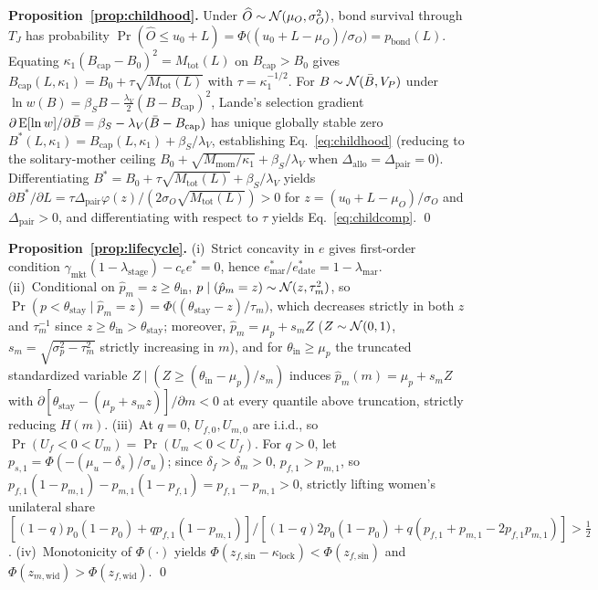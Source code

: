 \noindent\textbf{Proposition~\ref{prop:childhood}.} Under $\widehat{O}\sim\mathcal{N}(\mu_O,\sigma_O^2)$, bond survival through $T_J$ has probability $\Pr(\widehat{O}\le u_0+L)=\Phi\big((u_0+L-\mu_O)/\sigma_O\big)=p_{\mathrm{bond}}(L)$. Equating $\kappa_1(B_{\mathrm{cap}}-B_0)^2=M_{\mathrm{tot}}(L)$ on $B_{\mathrm{cap}}>B_0$ gives $B_{\mathrm{cap}}(L,\kappa_1)=B_0+\tau\sqrt{M_{\mathrm{tot}}(L)}$ with $\tau=\kappa_1^{-1/2}$. For $B\sim\mathcal{N}(\bar B,V_P)$ under $\ln w(B)=\beta_S B-\tfrac{\lambda_V}{2}(B-B_{\mathrm{cap}})^2$, Lande's selection gradient $\partial\operatorname{E}[\ln w]/\partial\bar B=\beta_S-\lambda_V(\bar B-B_{\mathrm{cap}})$ has unique globally stable zero $B^*(L,\kappa_1)=B_{\mathrm{cap}}(L,\kappa_1)+\beta_S/\lambda_V$, establishing Eq.~\eqref{eq:childhood} (reducing to the solitary-mother ceiling $B_0+\sqrt{M_{\mathrm{mom}}/\kappa_1}+\beta_S/\lambda_V$ when $\Delta_{\mathrm{allo}}=\Delta_{\mathrm{pair}}=0$). Differentiating $B^*=B_0+\tau\sqrt{M_{\mathrm{tot}}(L)}+\beta_S/\lambda_V$ yields $\partial B^*/\partial L=\tau\Delta_{\mathrm{pair}}\varphi(z)/(2\sigma_O\sqrt{M_{\mathrm{tot}}(L)})>0$ for $z=(u_0+L-\mu_O)/\sigma_O$ and $\Delta_{\mathrm{pair}}>0$, and differentiating with respect to $\tau$ yields Eq.~\eqref{eq:childcomp}. \qed

\noindent\textbf{Proposition~\ref{prop:lifecycle}.} (i)~Strict concavity in $e$ gives first-order condition $\gamma_{\mathrm{mkt}}(1-\lambda_{\mathrm{stage}})-c_ee^*=0$, hence $e_{\mathrm{mar}}^*/e_{\mathrm{date}}^*=1-\lambda_{\mathrm{mar}}$. (ii)~Conditional on $\hat p_m=z\ge\theta_{\mathrm{in}}$, $p\mid(\hat p_m=z)\sim\mathcal{N}(z,\tau_m^2)$, so $\Pr(p<\theta_{\mathrm{stay}}\mid\hat p_m=z)=\Phi\big((\theta_{\mathrm{stay}}-z)/\tau_m\big)$, which decreases strictly in both $z$ and $\tau_m^{-1}$ since $z\ge\theta_{\mathrm{in}}>\theta_{\mathrm{stay}}$; moreover, $\hat p_m=\mu_p+s_m Z$ ($Z\sim\mathcal{N}(0,1)$, $s_m=\sqrt{\sigma_p^2-\tau_m^2}$ strictly increasing in $m$), and for $\theta_{\mathrm{in}}\ge\mu_p$ the truncated standardized variable $Z\mid(Z\ge(\theta_{\mathrm{in}}-\mu_p)/s_m)$ induces $\hat p_m(m)=\mu_p+s_m Z$ with $\partial[\theta_{\mathrm{stay}}-(\mu_p+s_m z)]/\partial m<0$ at every quantile above truncation, strictly reducing $H(m)$. (iii)~At $q=0$, $U_{f,0},U_{m,0}$ are i.i.d., so $\Pr(U_f<0<U_m)=\Pr(U_m<0<U_f)$. For $q>0$, let $p_{s,1}=\Phi(-(\mu_u-\delta_s)/\sigma_u)$; since $\delta_f>\delta_m>0$, $p_{f,1}>p_{m,1}$, so $p_{f,1}(1-p_{m,1})-p_{m,1}(1-p_{f,1})=p_{f,1}-p_{m,1}>0$, strictly lifting women's unilateral share $[(1-q)p_0(1-p_0)+qp_{f,1}(1-p_{m,1})]/[(1-q)2p_0(1-p_0)+q(p_{f,1}+p_{m,1}-2p_{f,1}p_{m,1})]>\tfrac12$. (iv)~Monotonicity of $\Phi(\cdot)$ yields $\Phi(z_{f,\mathrm{sin}}-\kappa_{\mathrm{lock}})<\Phi(z_{f,\mathrm{sin}})$ and $\Phi(z_{m,\mathrm{wid}})>\Phi(z_{f,\mathrm{wid}})$. \qed

